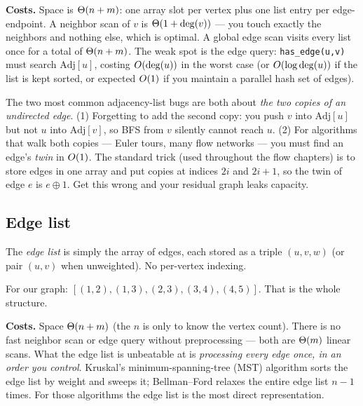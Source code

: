 \textbf{Costs.} Space is $\Theta(n + m)$: one array slot per vertex plus one list
entry per edge-endpoint. A neighbor scan of $v$ is $\Theta(1 + \deg(v))$ --- you
touch exactly the neighbors and nothing else, which is optimal. A global edge
scan visits every list once for a total of $\Theta(n + m)$. The weak spot is the
edge query: \texttt{has\_edge(u,v)} must search $\mathrm{Adj}[u]$, costing
$O(\deg(u))$ in the worst case (or $O(\log\deg(u))$ if the list is kept
sorted, or expected $O(1)$ if you maintain a parallel hash set of edges).

\begin{trapbox}
The two most common adjacency-list bugs are both about \emph{the two copies of
an undirected edge}. (1) Forgetting to add the second copy: you push $v$ into
$\mathrm{Adj}[u]$ but not $u$ into $\mathrm{Adj}[v]$, so BFS from $v$ silently
cannot reach $u$. (2) For algorithms that walk both copies --- Euler tours,
many flow networks --- you must find an edge's \emph{twin} in $O(1)$. The
standard trick (used throughout the flow chapters) is to store edges in one
array and put copies at indices $2i$ and $2i{+}1$, so the twin of edge $e$ is
$e \oplus 1$. Get this wrong and your residual graph leaks capacity.
\end{trapbox}

\subsection{Edge list}

\begin{definition}
\label{ch01:def-edgelist}
The \emph{edge list} is simply the array of edges, each stored as a triple
$(u, v, w)$ (or pair $(u,v)$ when unweighted). No per-vertex indexing.
\end{definition}

For our graph: $[(1,2),(1,3),(2,3),(3,4),(4,5)]$. That is the whole structure.

\textbf{Costs.} Space $\Theta(n + m)$ (the $n$ is only to know the vertex count).
There is no fast neighbor scan or edge query without preprocessing --- both are
$\Theta(m)$ linear scans. What the edge list is unbeatable at is \emph{processing
every edge once, in an order you control}. Kruskal's minimum-spanning-tree (MST)
algorithm sorts the edge list by weight and sweeps it; Bellman--Ford relaxes the
entire edge list $n-1$ times. For those algorithms the edge list is the most
direct representation.

